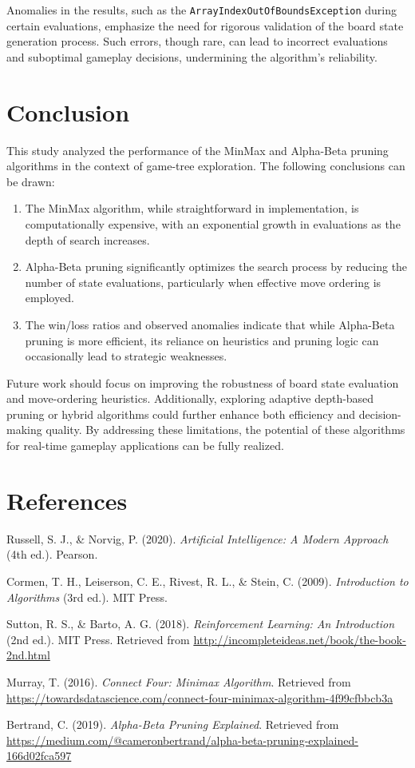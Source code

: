 \documentclass[11pt,a4paper]{article}
\begin{document}
Anomalies in the results, such as the \texttt{ArrayIndexOutOfBoundsException} during certain evaluations, emphasize the need for rigorous validation of the board state generation process. Such errors, though rare, can lead to incorrect evaluations and suboptimal gameplay decisions, undermining the algorithm's reliability.

\section{Conclusion}
This study analyzed the performance of the MinMax and Alpha-Beta pruning algorithms in the context of game-tree exploration. The following conclusions can be drawn:
\begin{enumerate}
    \item The MinMax algorithm, while straightforward in implementation, is computationally expensive, with an exponential growth in evaluations as the depth of search increases.
    \item Alpha-Beta pruning significantly optimizes the search process by reducing the number of state evaluations, particularly when effective move ordering is employed.
    \item The win/loss ratios and observed anomalies indicate that while Alpha-Beta pruning is more efficient, its reliance on heuristics and pruning logic can occasionally lead to strategic weaknesses.
\end{enumerate}

Future work should focus on improving the robustness of board state evaluation and move-ordering heuristics. Additionally, exploring adaptive depth-based pruning or hybrid algorithms could further enhance both efficiency and decision-making quality. By addressing these limitations, the potential of these algorithms for real-time gameplay applications can be fully realized.

\section{References}
\begin{enumerate}[label={[\arabic*]}]
    \item Russell, S. J., \& Norvig, P. (2020). \textit{Artificial Intelligence: A Modern Approach} (4th ed.). Pearson.
    \item Cormen, T. H., Leiserson, C. E., Rivest, R. L., \& Stein, C. (2009). \textit{Introduction to Algorithms} (3rd ed.). MIT Press.
    \item Sutton, R. S., \& Barto, A. G. (2018). \textit{Reinforcement Learning: An Introduction} (2nd ed.). MIT Press. Retrieved from \url{http://incompleteideas.net/book/the-book-2nd.html}
    \item Murray, T. (2016). \textit{Connect Four: Minimax Algorithm}. Retrieved from \url{https://towardsdatascience.com/connect-four-minimax-algorithm-4f99cfbbcb3a}
    \item Bertrand, C. (2019). \textit{Alpha-Beta Pruning Explained}. Retrieved from \url{https://medium.com/@cameronbertrand/alpha-beta-pruning-explained-166d02fca597}
\end{enumerate}
\end{document}
